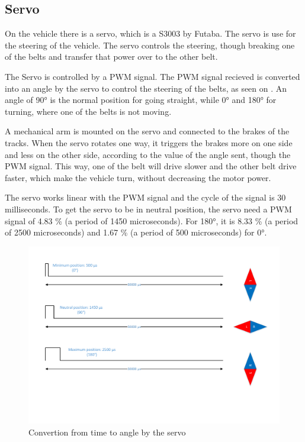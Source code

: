 \subsection{Servo}
On the vehicle there is a servo, which is a S3003 by Futaba.
The servo is use for the steering of the vehicle. The servo controls the steering, though breaking one of the belts and transfer that power over to the other belt.


The Servo is controlled by a PWM signal. The PWM signal recieved is converted into an angle by the servo to control the steering of the belts, as seen on . An angle of 90° is the normal position for going straight, while 0° and 180° for turning, where one of the belts is not moving. 

A mechanical arm is mounted on the servo and connected to the brakes of the tracks. When the servo rotates one way, it triggers the brakes more on one side and less on the other side, according to the value of the angle sent, though the PWM signal. This way, one of the belt will drive slower and the other belt drive faster, which make the vehicle turn, without decreasing the motor power.

The servo works linear with the PWM signal and the cycle of the signal is 30 milliseconds. To get the servo to be in neutral position, the servo need a PWM signal of 4.83 \% (a period of 1450 microseconds). For 180°, it is 8.33 \% (a period of 2500 microseconds) and 1.67 \% (a period of 500 microseconds) for 0°. \\


\begin{figure}[H]
	\centering
	\includegraphics[scale=0.6]{figures/timeVSangle.pdf}
	\caption{Convertion from time to angle by the servo\cite {AServos}}
	\label{timeVSangle}
\end{figure}

